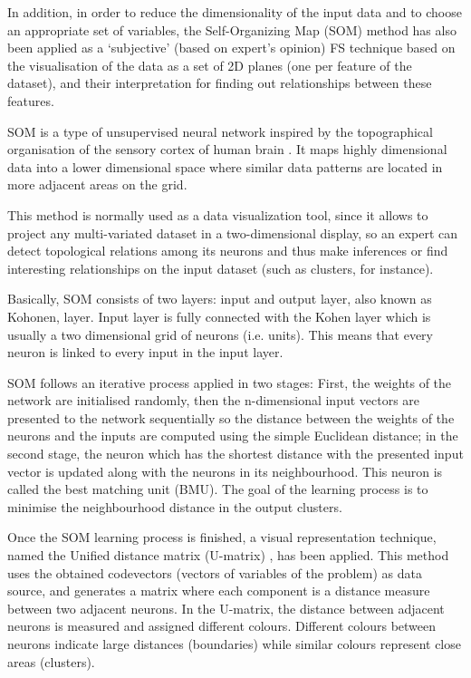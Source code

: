 \documentclass[a4paper,10pt,twocolumn,preprint,3p]{elsarticle}
\begin{document}
In addition, in order to reduce the dimensionality of the input data
and to choose an appropriate set of variables, the Self-Organizing Map
(SOM) \cite{kohonen1998} method has also been applied as a `subjective' 
(based on expert's opinion) FS technique based on the visualisation of the 
data as a set of 2D planes (one per feature of the dataset), and their 
interpretation for finding out relationships between these features.

SOM is a type of unsupervised neural network inspired by the
topographical organisation of the sensory cortex of human brain
\cite{kohonen1998}. It maps highly dimensional data into a lower
dimensional space where similar data patterns are located in more
adjacent areas on the grid. 

This method is normally used as a data visualization tool, since it allows 
to project any multi-variated dataset in a two-dimensional display, 
so an expert can detect topological relations among its neurons and thus 
make inferences or find interesting relationships on the input dataset 
(such as clusters, for instance).

Basically, SOM consists of two layers: input and output layer, also
known as Kohonen, layer. Input layer is fully connected with the 
Kohen layer which is usually a two dimensional grid of neurons
(i.e. units). This means that every neuron is linked to every input in
the input layer. 

SOM follows an iterative process applied in two stages: First, the
weights of the network are initialised randomly, then the n-dimensional
input vectors are presented to the network sequentially so the
distance between the weights of the neurons and the inputs are
computed using the simple Euclidean distance; in the second stage, the
neuron which has the shortest distance with the presented input vector
is updated along with the neurons in its neighbourhood. 
This neuron is called the best matching unit (BMU). 
The goal of the learning process is to minimise the neighbourhood distance 
in the output clusters.  

Once the SOM learning process is finished, a visual representation technique, 
named the Unified distance matrix (U-matrix) \cite{UmatUlts}, has been applied. 
This method uses the obtained codevectors (vectors of variables of the problem) 
as data source, and generates a matrix where each component is a distance 
measure between two adjacent neurons. In the U-matrix, the distance between 
adjacent neurons is measured and assigned different colours. Different colours 
between neurons indicate large distances (boundaries) while similar colours 
represent close areas (clusters).
\end{document}
